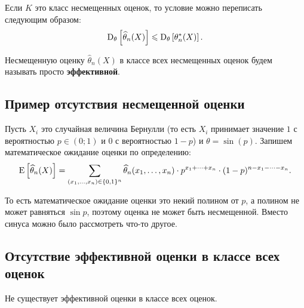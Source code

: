 Если $K$ это класс несмещенных оценок, то условие можно переписать следующим образом:
\begin{equation*}
    \operatorname{D}_{\theta} \left[ \widehat{\theta}_n(X) \right] \leqslant \operatorname{D}_{\theta} \left[ \theta_n^*(X) \right].
\end{equation*}

\begin{definition*}
    Несмещенную оценку $\widehat{\theta}_n(X)$ в классе всех несмещенных оценок будем называть просто \textbf{эффективной}.
\end{definition*} 

\subsection{Пример отсутствия несмещенной оценки}

\begin{example}
    Пусть $X_i$ это случайная величина Бернулли (то есть $X_i$ принимает значение $1$ с вероятностью $p \in (0; 1)$ и $0$ с вероятностью $1 - p$) и $\theta = \sin(p)$.
    Запишем математическое ожидание оценки по определению:
    \begin{equation*}
        \operatorname{E} \left[\widehat{\theta}_n(X)\right]
        = \sum_{(x_1, \dots, x_n) \in \{0, 1\}^n} \widehat{\theta}_n (x_1, \dots, x_n) \cdot p^{x_1 + \dots + x_n} \cdot (1 - p)^{n - x_1 - \dots - x_n}.
    \end{equation*}

    То есть математическое ожидание оценки это некий полином от $p$, а полином не может равняться $\sin p$, поэтому оценка не может быть несмещенной. Вместо синуса можно было рассмотреть что-то другое.
\end{example}

\subsection{Отсутствие эффективной оценки в классе всех оценок}

\begin{proposition*}
    Не существует эффективной оценки в классе всех оценок.
\end{proposition*}

